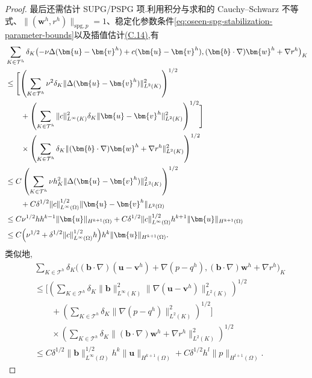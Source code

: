 \begin{proof}
最后还需估计 SUPG/PSPG 项.利用积分与求和的 Cauchy--Schwarz 不等式、$\|(\bm{w}^h,r^h)\|_{\mathrm{spg},p}=1$、稳定化参数条件\cref{eq:oseen-spg-stabilization-parameter-bounds}以及插值估计\hyperref[eq:interpolation-error-estimate]{(C.14)},有
\begin{equation}\label{eq:oseen-spg-error-supg-diffusion-reaction}
\begin{aligned}
 &\sum_{K\in\mathcal{T}^h}\delta_K
       \bigl(-\nu\Delta(\bm{u}-\bm{v}^h)
             +c(\bm{u}-\bm{v}^h),
             (\bm{b}\cdot\nabla)\bm{w}^h+\nabla r^h\bigr)_K\\
 &\le\Biggl[\left(\sum_{K\in\mathcal{T}^h}
       \nu^2\delta_K\|\Delta(\bm{u}-\bm{v}^h)\|_{L^2(K)}^2
       \right)^{1/2}\\
 &\qquad+\left(\sum_{K\in\mathcal{T}^h}
       \|c\|_{L^\infty(K)}^2\delta_K
       \|\bm{u}-\bm{v}^h\|_{L^2(K)}^2\right)^{1/2}\Biggr]\\
 &\qquad\times\left(\sum_{K\in\mathcal{T}^h}\delta_K
       \|(\bm{b}\cdot\nabla)\bm{w}^h+\nabla r^h\|_{L^2(K)}^2
       \right)^{1/2}\\
 &\le C\left(\sum_{K\in\mathcal{T}^h}
       \nu h_K^2\|\Delta(\bm{u}-\bm{v}^h)\|_{L^2(K)}^2
       \right)^{1/2}\\
 &\qquad+C\delta^{1/2}\|c\|_{L^\infty(\Omega)}^{1/2}
       \|\bm{u}-\bm{v}^h\|_{L^2(\Omega)}\\
 &\le C\nu^{1/2}h h^{k-1}
       \|\bm{u}\|_{H^{k+1}(\Omega)}
       +C\delta^{1/2}\|c\|_{L^\infty(\Omega)}^{1/2}h^{k+1}
       \|\bm{u}\|_{H^{k+1}(\Omega)}\\
 &\le C\Bigl(\nu^{1/2}
       +\delta^{1/2}\|c\|_{L^\infty(\Omega)}^{1/2}h\Bigr)
       h^k\|\bm{u}\|_{H^{k+1}(\Omega)}.
\end{aligned}
\end{equation}
类似地,
\begin{equation}\label{eq:oseen-spg-error-supg-convection-pressure}
\begin{aligned}
 &\sum_{K\in\mathcal{T}^h}\delta_K
       \bigl((\bm{b}\cdot\nabla)(\bm{u}-\bm{v}^h)
              +\nabla(p-q^h),
             (\bm{b}\cdot\nabla)\bm{w}^h+\nabla r^h\bigr)_K\\
 &\le\Biggl[\left(\sum_{K\in\mathcal{T}^h}
       \delta_K\|\bm{b}\|_{L^\infty(K)}^2
       \|\nabla(\bm{u}-\bm{v}^h)\|_{L^2(K)}^2
       \right)^{1/2}\\
 &\qquad+\left(\sum_{K\in\mathcal{T}^h}
       \delta_K\|\nabla(p-q^h)\|_{L^2(K)}^2\right)^{1/2}\Biggr]\\
 &\qquad\times\left(\sum_{K\in\mathcal{T}^h}\delta_K
       \|(\bm{b}\cdot\nabla)\bm{w}^h+\nabla r^h\|_{L^2(K)}^2
       \right)^{1/2}\\
 &\le C\delta^{1/2}\|\bm{b}\|_{L^\infty(\Omega)}^{1/2}h^k
       \|\bm{u}\|_{H^{k+1}(\Omega)}
       +C\delta^{1/2}h^l\|p\|_{H^{l+1}(\Omega)}.
\end{aligned}
\end{equation}


\end{proof}
